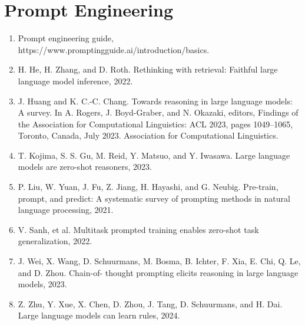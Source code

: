 \documentclass[]{article}
\begin{document}
\section{Prompt Engineering}
\begin{enumerate}
\item Prompt engineering guide, https://www.promptingguide.ai/introduction/basics.
\item H. He, H. Zhang, and D. Roth. Rethinking with retrieval: Faithful large language model inference, 2022.
\item J. Huang and K. C.-C. Chang. Towards reasoning in large language models: A survey. In A. Rogers,
J. Boyd-Graber, and N. Okazaki, editors, Findings of the Association for Computational Linguistics:
ACL 2023, pages 1049–1065, Toronto, Canada, July 2023. Association for Computational Linguistics.
\item T. Kojima, S. S. Gu, M. Reid, Y. Matsuo, and Y. Iwasawa. Large language models are zero-shot reasoners,
2023.
\item P. Liu, W. Yuan, J. Fu, Z. Jiang, H. Hayashi, and G. Neubig. Pre-train, prompt, and predict: A
systematic survey of prompting methods in natural language processing, 2021.
\item V. Sanh, et al. Multitask prompted training enables zero-shot
task generalization, 2022.
\item J. Wei, X. Wang, D. Schuurmans, M. Bosma, B. Ichter, F. Xia, E. Chi, Q. Le, and D. Zhou. Chain-of-
thought prompting elicits reasoning in large language models, 2023.
\item Z. Zhu, Y. Xue, X. Chen, D. Zhou, J. Tang, D. Schuurmans, and H. Dai. Large language models can
learn rules, 2024.
\end{enumerate}
\end{document}
